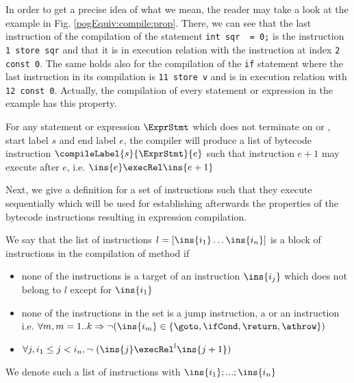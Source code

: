 In order to get a precise idea of what we mean, the reader may take a look at the example in Fig. \ref{pogEquiv:compile:prop}.
There, we can see that the last instruction of the compilation of the statement \lstinline!int sqr  = 0;! is the instruction \lstinline!1 store sqr! 
and that it is in execution relation with the instruction at index \lstinline!2 const 0!. The same holds also for the compilation of the \lstinline!if!
statement where the last instruction  in its compilation is \lstinline!11 store v! and is  in execution relation with \lstinline!12 const 0!.
Actually, the compilation of every statement or expression in the example has this property.

\begin{compProp}\label{compile:prop:compProp0}
 For any statement or expression $\ExprStmt$ which does not terminate on \return or \athrow, start label $s$ and end label $e$,
    the compiler will produce a list of bytecode instruction $\compileLabel{s}{\ExprStmt}{e}$ such that  instruction  $e+1$ may execute after
    $e$, i.e.   $ \ins{e} \execRel \ins{e+1}$
\end{compProp}





 


Next, we give a definition for a set of instructions such that they execute sequentially which will be used for 
establishing afterwards the properties of the bytecode instructions resulting in expression compilation.
 
\begin{seqInstr} \label{seqInstr}
We say that the list of instructions  $l  = \lbrack \ins{i_1} \ldots \ins{i_n} \rbrack$ is a block of instructions
 in the compilation of method \methodd{} if 
 \begin{itemize}
      \item none of the instructions is a target of an instruction $\ins{i_j}$ which does not belong to $l$ except for $\ins{i_1}$
      \item none of the instructions in the set is a jump instruction, a \return{} or an \athrow instruction
            i.e. $\forall m, m = 1..k \Rightarrow \neg( \ins{i_m} \in  \{\goto, \ifCond, \return, \athrow \} )  $ 
      \item $  \forall j, i_1 \le  j < i_n , \neg  \ ( \ins{j} \execRel^{l} \ins{j + 1} ) $ 
 \end{itemize}

We denote such a list of instructions with $\ins{i_1};...;\ins{i_n}$

\end{seqInstr}



